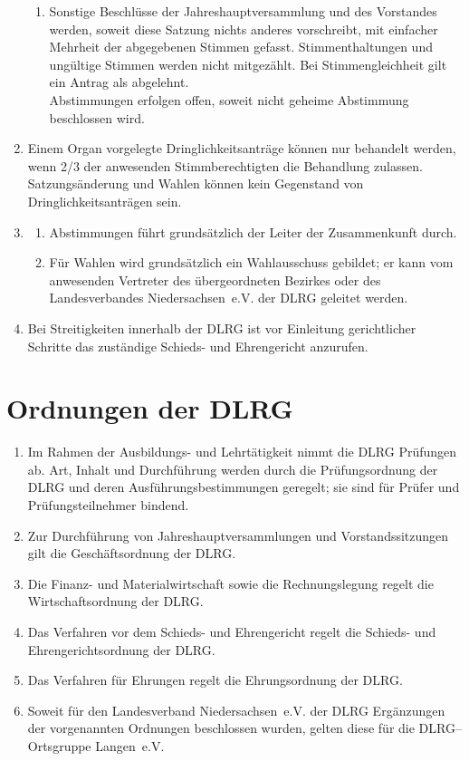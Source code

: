 \documentclass[%
12pt, %
a4paper, %
headsepline, %
parskip, %
headings=normal, %
]{scrreprt}
\begin{document}
\begin{enumerate}
\begin{enumerate}[noitemsep]
        \item Sonstige Beschlüsse der Jahreshauptversammlung und des Vorstandes werden, soweit diese Satzung nichts anderes vorschreibt, mit einfacher Mehrheit der abgegebenen Stimmen gefasst. Stimmenthaltungen und ungültige Stimmen werden nicht mitgezählt. Bei Stimmengleichheit gilt ein Antrag als abgelehnt.\\
          Abstimmungen erfolgen offen, soweit nicht geheime Abstimmung beschlossen wird.
      \end{enumerate}
    \item Einem Organ vorgelegte Dringlichkeitsanträge können nur behandelt werden, wenn \num{2/3} der anwesenden Stimmberechtigten die Behandlung zulassen. Satzungsänderung und Wahlen können kein Gegenstand von Dringlichkeitsanträgen sein.
    \item \begin{enumerate}[noitemsep]
        \item Abstimmungen führt grundsätzlich der Leiter der Zusammenkunft durch.
        \item Für Wahlen wird grundsätzlich ein Wahlausschuss gebildet; er kann vom anwesenden Vertreter des übergeordneten Bezirkes oder des Landesverbandes Niedersachsen~e.V. der DLRG geleitet werden.
      \end{enumerate}
    \item Bei Streitigkeiten innerhalb der DLRG ist vor Einleitung gerichtlicher Schritte das zuständige Schieds- und Ehrengericht anzurufen.
\end{enumerate}

\section{Ordnungen der DLRG}
\label{sec:ordnungen}
\begin{enumerate}
    \item Im Rahmen der Ausbildungs- und Lehrtätigkeit nimmt die DLRG Prüfungen ab. Art, Inhalt und Durchführung werden durch die Prüfungsordnung der DLRG und deren Ausführungsbestimmungen geregelt; sie sind für Prüfer und Prüfungsteilnehmer bindend.
    \item Zur Durchführung von Jahreshauptversammlungen und Vorstandssitzungen gilt die Geschäftsordnung der DLRG.
    \item Die Finanz- und Materialwirtschaft sowie die Rechnungslegung regelt die Wirtschaftsordnung der DLRG.
    \item Das Verfahren vor dem Schieds- und Ehrengericht regelt die Schieds- und Ehrengerichtsordnung der DLRG.
    \item Das Verfahren für Ehrungen regelt die Ehrungsordnung der DLRG.
    \item Soweit für den Landesverband Niedersachsen~e.V. der DLRG Ergänzungen der vorgenannten Ordnungen beschlossen wurden, gelten diese für die DLRG--Ortsgruppe Langen~e.V.
\end{enumerate}
\end{document}
